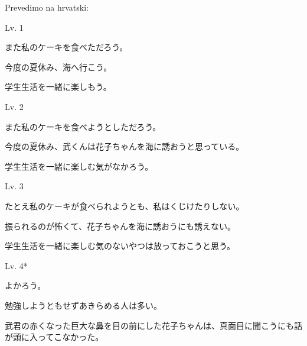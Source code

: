 	\begin{reibun}
	\end{reibun}
	
	\newpage
	
	\noindent
	Prevedimo na hrvatski:
	
	\begin{mondai}{Lv. 1}
		\item また私のケーキを食べただろう。
		\item 今度の夏休み、海へ行こう。
		\item 学生生活を一緒に楽しもう。
	\end{mondai}

	\begin{mondai}{Lv. 2}
		\item また私のケーキを食べようとしただろう。
		\item 今度の夏休み、武くんは花子ちゃんを海に誘おうと思っている。
		\item 学生生活を一緒に楽しむ気がなかろう。
	\end{mondai}

	\begin{mondai}{Lv. 3}
		\item たとえ私のケーキが食べられようとも、私はくじけたりしない。
		\item 振られるのが怖くて、花子ちゃんを海に誘おうにも誘えない。
		\item 学生生活を一緒に楽しむ気のないやつは放っておこうと思う。
	\end{mondai}

	\begin{mondai}{Lv. 4*}
		\item よかろう。
		\item 勉強しようともせずあきらめる人は多い。
		\item 武君の赤くなった巨大な鼻を目の前にした花子ちゃんは、真面目に聞こうにも話が頭に入ってこなかった。
	\end{mondai}
	
